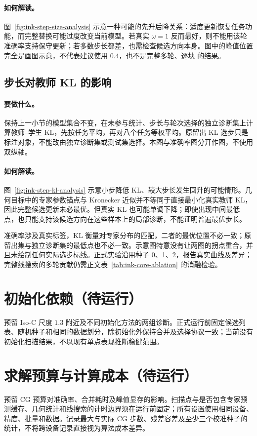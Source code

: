 \paragraph{如何解读。}
图~\ref{fig:ink-step-size-analysis} 示意一种可能的先升后降关系：适度更新恢复任务功能，而完整替换可能过度改变当前模型。若真实 $\omega=1$ 反而最好，则不能用该轮准确率支持保守更新；若多数步长都差，也需检查候选方向本身。图中的峰值位置完全是画图示意，不代表建议使用 $0.4$，也不是完整多轮、逐块 \method{} 的结果。

\clearpage
\subsection{步长对教师 KL 的影响}
\paragraph{要做什么。}
保持上一小节的模型集合不变，在未参与统计、步长与轮次选择的独立诊断集上计算教师--学生 KL，先按任务平均，再对八个任务等权平均。原留出 KL 选步只是标注对象，不能改由独立诊断集或测试集选择。本图与准确率图分开作图，不使用双纵轴。



\paragraph{如何解读。}
图~\ref{fig:ink-step-kl-analysis} 示意小步降低 KL、较大步长发生回升的可能情形。几何目标中的专家参数锚点与 Kronecker 近似并不等同于直接最小化真实教师 KL，因此完整候选更新未必最优。但真实 KL 也可能单调下降；即使出现中间最低点，也只能支持该候选方向在这些样本上的局部诊断，不能证明普遍最优步长。

准确率涉及真实标签，KL 衡量对专家分布的匹配，二者的最优位置不必一致；原留出集与独立诊断集的最低点也不必一致。示意图特意没有让两图的拐点重合，并且未绘制任何实际选步标线。正式实验沿用种子 0、1、2，报告真实曲线及差异；完整线搜索的多轮贡献仍需正文表~\ref{tab:ink-core-ablation} 的消融检验。

\clearpage
\section{初始化依赖（待运行）}
\label{apdx:ink-initialization}



预留 Iso-C 尺度 $1.3$ 附近及不同初始化方法的两组诊断。正式运行前固定候选列表、随机种子和相同的数据划分，除初始化外保持合并及选择协议一致；当前没有初始化扫描结果，不以现有单点表现推断稳健范围。

\FloatBarrier
\section{求解预算与计算成本（待运行）}
\label{apdx:ink-cost}



预留 CG 预算对准确率、合并耗时及峰值显存的影响。扫描点与是否包含专家预测缓存、几何统计和线搜索的计时边界须在运行前固定；所有设置使用相同设备、精度、批量和数据。记录最大与实际 CG 步数、残差容差及至少三个校准种子的统计，不将跨设备记录直接视为算法成本差异。

\FloatBarrier
